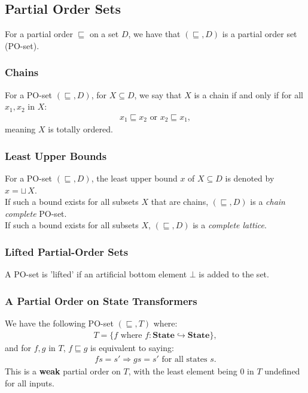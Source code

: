 \subsection{Partial Order Sets}

For a partial order $\sqsubseteq$ on a set $D$, we have that
$(\sqsubseteq, D)$ is a partial order set (PO-set).

\subsubsection{Chains}

For a PO-set $(\sqsubseteq, D)$, for $X \subseteq D$, we say that
$X$ is a chain if and only if for all $x_1, x_2$ in $X$: \begin{gather*}
  x_1 \sqsubseteq x_2 \text{ or } x_2 \sqsubseteq x_1,
\end{gather*} meaning $X$ is totally ordered. 

\subsubsection{Least Upper Bounds}

For a PO-set $(\sqsubseteq, D)$, the least upper bound 
$x$ of $X \subseteq D$ is denoted by $x = \sqcup \, X$. 
\\[\baselineskip]
If such a bound exists for all subsets $X$ that are chains, 
$(\sqsubseteq, D)$ is a \textit{chain complete} PO-set.
\\[\baselineskip]
If such a bound exists for all subsets $X$, $(\sqsubseteq, D)$ 
is a \textit{complete lattice}.

\subsubsection{Lifted Partial-Order Sets}

A PO-set is 'lifted' if an artificial bottom element $\bot$
is added to the set.

\subsubsection{A Partial Order on State Transformers}

We have the following PO-set $(\sqsubseteq, T)$ where: \begin{gather*}
  T = \{f \text{ where } f : \textbf{State} \hookrightarrow \textbf{State}\},
\end{gather*} and for $f, g$ in $T$, $f \sqsubseteq g$
is equivalent to saying: \begin{gather*}
  f s = s' \Rightarrow g s = s' \text{ for all states } s. 
\end{gather*} This is a \textbf{weak} partial order on $T$, with
the least element being $0$ in $T$ undefined for all inputs.

